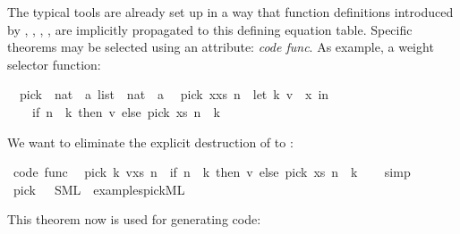\begin{isabellebody}
\begin{isamarkuptext}
  The typical  tools are already set up in a way that
  function definitions introduced by \isa{{\isasymDEFINITION}},
  \isa{{\isasymFUN}},
  \isa{{\isasymFUNCTION}}, \isa{{\isasymPRIMREC}},
  \isa{{\isasymRECDEF}} are implicitly propagated
  to this defining equation table. Specific theorems may be
  selected using an attribute: \emph{code func}. As example,
  a weight selector function:%
\end{isamarkuptext}%
\isamarkuptrue%
\isamarkupfalse%
\isanewline
\ \ pick\ {\isacharcolon}{\isacharcolon}\ {\isachardoublequoteopen}{\isacharparenleft}nat\ {\isasymtimes}\ {\isacharprime}a{\isacharparenright}\ list\ {\isasymRightarrow}\ nat\ {\isasymRightarrow}\ {\isacharprime}a{\isachardoublequoteclose}\isanewline
\isanewline
{}\isamarkupfalse%
\isanewline
\ \ {\isachardoublequoteopen}pick\ {\isacharparenleft}x{\isacharhash}xs{\isacharparenright}\ n\ {\isacharequal}\ {\isacharparenleft}let\ {\isacharparenleft}k{\isacharcomma}\ v{\isacharparenright}\ {\isacharequal}\ x\ in\isanewline
\ \ \ \ if\ n\ {\isacharless}\ k\ then\ v\ else\ pick\ xs\ {\isacharparenleft}n\ {\isacharminus}\ k{\isacharparenright}{\isacharparenright}{\isachardoublequoteclose}%
\begin{isamarkuptext}%
\noindent We want to eliminate the explicit destruction
  of  to :%
\end{isamarkuptext}%
\isamarkuptrue%
\isamarkupfalse%
\ {\isacharbrackleft}code\ func{\isacharbrackright}{\isacharcolon}\isanewline
\ \ {\isachardoublequoteopen}pick\ {\isacharparenleft}{\isacharparenleft}k{\isacharcomma}\ v{\isacharparenright}{\isacharhash}xs{\isacharparenright}\ n\ {\isacharequal}\ {\isacharparenleft}if\ n\ {\isacharless}\ k\ then\ v\ else\ pick\ xs\ {\isacharparenleft}n\ {\isacharminus}\ k{\isacharparenright}{\isacharparenright}{\isachardoublequoteclose}\isanewline
%
\isadelimproof
\ \ %
\endisadelimproof
%
\isatagproof
{}\isamarkupfalse%
\ simp%
\endisatagproof
{\isafoldproof}%
%
\isadelimproof
\isanewline
%
\endisadelimproof
\isanewline
{}\isamarkupfalse%
\ pick\ \ \ SML\ \ {\isachardoublequoteopen}examples{\isacharslash}pick{}{\isachardot}ML{\isachardoublequoteclose}%
\begin{isamarkuptext}%
\noindent This theorem now is used for generating code:



\end{isamarkuptext}
\end{isabellebody}

